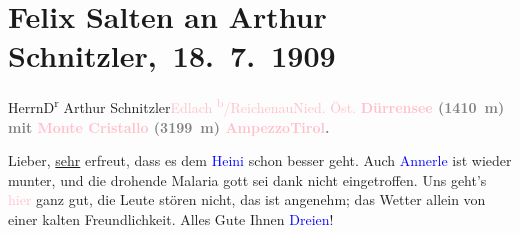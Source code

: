 

\renewcommand{\erwaehntePersonen}{Personen: Anna Katharina Rehmann, Felix Salten, Heinrich Schnitzler, Olga Schnitzler}
\renewcommand{\erwaehnteOrte}{Orte: Ampezzo, Edlach, Höhlenstein, Lago di Landro, Monte Cristallo, Niederösterreich, Südtirol}
\renewcommand{\erwaehnteWerke}{}
\section[ Felix Salten an Arthur Schnitzler, 18. 7. 1909]{Felix Salten an Arthur Schnitzler, 18. 7. 1909}
\nopagebreak{}
\rehead{ }\normalsize\beginnumbering{}
\toendnotes[C]{\smallbreak\pagebreak[2]}
\toendnotes[C]{\smallbreak}\pstart{}{\pb}Herrn\pend{}\pstart{}D\textsuperscript{r} Arthur Schnitzler\pend{}\pstart{}\textcolor{pink}{Edlach \textsuperscript{b}/Reichenau}{}\ledrightnote{\textcolor{pink}{Edlach}}\pend{}\pstart{}\textcolor{pink}{Nied. Öst.}{}\ledrightnote{\textcolor{pink}{Niederösterreich}}\pend{}
{\bigskip}
\pstart
           \noindent{}\centering{}{\pb}\textcolor{gray}{\textbf{\textcolor{pink}{Dürrensee}{}\ledrightnote{\textcolor{pink}{Lago di Landro}} (1410 m) mit \textcolor{pink}{Monte Cristallo}{}\ledrightnote{\textcolor{pink}{Monte Cristallo}} (3199 m) \textcolor{pink}{Ampezzo}{}\ledrightnote{\textcolor{pink}{Ampezzo}}{\dotstwo}{ }\textcolor{pink}{Tirol}{}\ledrightnote{\textcolor{pink}{Südtirol}}.}}\pend
           
\pstart
           {\pb}Lieber,{ }\uline{sehr} erfreut, dass es dem \textcolor{blue}{Heini}{}\ledrightnote{\textcolor{blue}{Heinrich Schnitzler}} schon besser geht. Auch \textcolor{blue}{Annerle}{}\ledrightnote{\textcolor{blue}{Anna Katharina Rehmann}} ist wieder munter, und die drohende Malaria gott sei
               dank nicht eingetroffen. Uns geht’s \textcolor{pink}{hier}{}\ledrightnote{{$\rightarrow$}\textcolor{pink}{Höhlenstein}} ganz gut, die Leute stören nicht, das \label{K_L03503-1v}\label{K_L03503-1h} ist angenehm; das Wetter allein von einer kalten Freundlichkeit.
               Alles Gute Ihnen \textcolor{blue}{Dreien}{}\ledrightnote{{$\rightarrow$}\textcolor{blue}{Olga Schnitzler}{\newline}{$\rightarrow$}\textcolor{blue}{Heinrich Schnitzler}}! \pend
           
